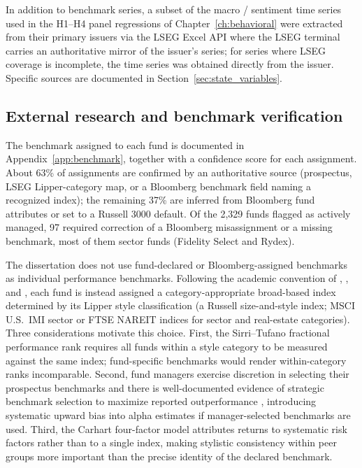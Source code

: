 \documentclass[12pt, oneside]{report}
\begin{document}
In addition to benchmark series, a subset of the macro / sentiment time
series used in the H1--H4 panel regressions of
Chapter~\ref{ch:behavioral} were extracted from their primary issuers
via the LSEG Excel API where the LSEG terminal carries an authoritative
mirror of the issuer's series; for series where LSEG coverage is
incomplete, the time series was obtained directly from the issuer.
Specific sources are documented in Section~\ref{sec:state_variables}.

\subsection{External research and benchmark verification}
\label{sec:external_research}

\noindent The benchmark assigned to each fund is documented in
Appendix~\ref{app:benchmark}, together with a confidence score for each
assignment. About 63\% of assignments are confirmed by an authoritative
source (prospectus, LSEG Lipper-category map, or a Bloomberg benchmark
field naming a recognized index); the remaining 37\% are inferred from
Bloomberg fund attributes or set to a Russell 3000 default. Of the
2{,}329 funds flagged as actively managed, 97 required correction of a
Bloomberg misassignment or a missing benchmark, most of them sector funds
(Fidelity Select and Rydex).

The dissertation does not use fund-declared or Bloomberg-assigned
benchmarks as individual performance benchmarks. Following the academic
convention of
\textcite{SirriTufano1998}, \textcite{CremersPetajisto2009}, and
\textcite{FamaFrench2010}, each fund is instead assigned a
category-appropriate broad-based index determined by its Lipper style
classification (a Russell size-and-style index; MSCI U.S.\ IMI
sector or FTSE NAREIT indices for sector and real-estate categories). Three considerations motivate this
choice. First, the Sirri--Tufano fractional performance rank
requires all funds within a style category to be measured against
the same index; fund-specific benchmarks would render within-category
ranks incomparable. Second, fund managers exercise discretion in
selecting their prospectus benchmarks and there is well-documented
evidence of strategic benchmark selection to maximize reported
outperformance \parencite{Sensoy2009}, introducing systematic upward
bias into alpha estimates if manager-selected benchmarks are used.
Third, the Carhart four-factor model attributes returns to systematic
risk factors rather than to a single index, making stylistic
consistency within peer groups more important than the precise
identity of the declared benchmark.
\end{document}
